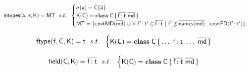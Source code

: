 \documentclass[a4paper,USenglish]{tex/lipics-v2016}
\begin{document}
\hrulefill



\begin{equation*}
\classoffs\a\s\K = \EMxt{MT} ~~s.t.~~ \begin{cases}

 \s(\a) = \obj\C{\b\a} \\
 \K(\C) = \Class \C {\b{\Ftype\f\t}}{\b\md} \\
 \EMxt{MT} = \{\convert{\b\md} \oplus \forall ~\Ftype\fp\tp \in \b{\Ftype\f\t} ~|~ \fp \notin \b{\names{\md}} ~.~ \convertFD{\Ftype\fp\tp}\}

\end{cases}
\end{equation*}

\hrulefill


\begin{equation*}
\ftype\f\C\K = \t ~~s.t.~~ \begin{cases}

 \K(\C) = \Class \C {\ldots ~ \Ftype\f\t ~ \ldots}{\b\md}
\end{cases}
\end{equation*}

\hrulefill


\begin{equation*}
\field\C\K = \b{\Ftype\f\t} ~~s.t.~~ \begin{cases}

 \K(\C) = \Class \C {\b{\Ftype\f\t}}{\b\md}
\end{cases}
\end{equation*}
\end{document}
